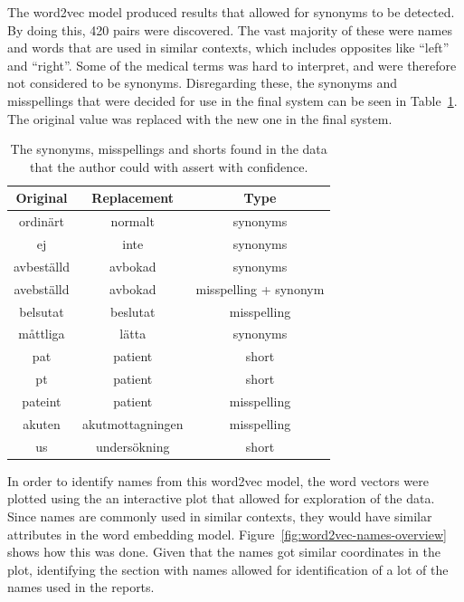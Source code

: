 The word2vec model produced results that allowed for synonyms to be detected.
By doing this, 420 pairs were discovered.
The vast majority of these were names and words that are used in similar contexts, which includes opposites like ``left'' and ``right''.
Some of the medical terms was hard to interpret, and were therefore not considered to be synonyms.
Disregarding these, the synonyms and misspellings that were decided for use in the final system can be seen in Table~\ref{tab:synonyms}.
The original value was replaced with the new one in the final system.

\begin{table}
    \centering
    \begin{tabular}{|ccc|}
        \hline
        \textbf{Original} & \textbf{Replacement} & \textbf{Type} \\
        \hline
        ordinärt & normalt & synonyms \\
        ej & inte & synonyms \\
        avbeställd & avbokad & synonyms \\
        avebställd & avbokad & misspelling + synonym \\
        belsutat & beslutat & misspelling \\
        måttliga & lätta & synonyms \\
        pat & patient & short \\
        pt & patient & short \\
        pateint & patient & misspelling \\
        akuten & akutmottagningen & misspelling \\
        us & undersökning & short \\
        \hline
    \end{tabular}
    \caption{The synonyms, misspellings and shorts found in the data that the author could with assert with confidence.}
    \label{tab:synonyms}
\end{table}

In order to identify names from this word2vec model, the word vectors were plotted using the an interactive plot that allowed for exploration of the data.
Since names are commonly used in similar contexts, they would have similar attributes in the word embedding model.
Figure~\ref{fig:word2vec-names-overview} shows how this was done.
Given that the names got similar coordinates in the plot, identifying the section with names allowed for identification of a lot of the names used in the reports.

